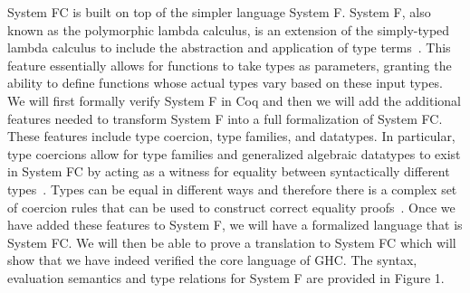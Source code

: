 \documentclass{sig-alternate}
\begin{document}
System FC is built on top of the simpler language System F. System F, also known as the polymorphic lambda calculus, is an extension of the simply-typed lambda calculus to include the abstraction and application of type terms~\cite{Pierce:TAPL}. This feature essentially allows for functions to take types as parameters, granting the ability to define functions whose actual types vary based on these input types. We will first formally verify System F in Coq and then we will add the additional features needed to transform System F into a full formalization of System FC. These features include type coercion, type families, and datatypes. In particular, type coercions allow for type families and generalized algebraic datatypes to exist in System FC by acting as a witness for equality between syntactically different types~\cite{DBLP:conf/rta/VytiniotisJ13}. Types can be equal in different ways and therefore there is a complex set of coercion rules that can be used to construct correct equality proofs~\cite{Breitner:2014:SZC:2628136.2628141}.  Once we have added these features to System F, we will have a formalized language that is System FC. We will then be able to prove a translation to System FC which will show that we have indeed verified the core language of GHC. The syntax, evaluation semantics and type relations for System F are provided in Figure 1.\vspace{1cm}\\
\newcommand\mybox[2][]{#2}%
\\
\end{document}
